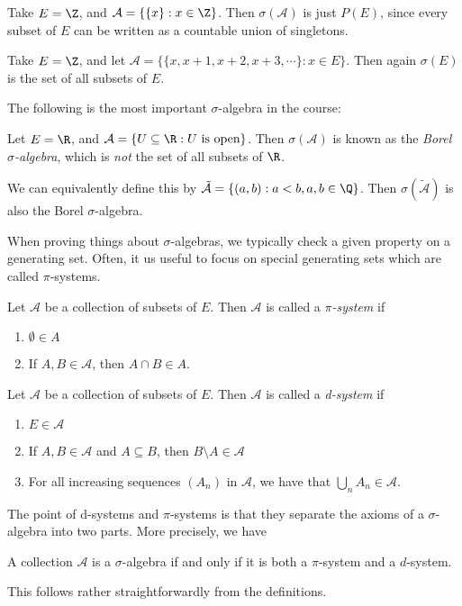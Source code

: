 \documentclass[a4paper]{article}
\begin{document}
\begin{eg}
  Take $E = \Z$, and $\mathcal{A} = \{\{x\}: x \in \Z\}$. Then $\sigma(\mathcal{A})$ is just $P(E)$, since every subset of $E$ can be written as a countable union of singletons.
\end{eg}

\begin{eg}
  Take $E = \Z$, and let $\mathcal{A} = \{ \{x, x + 1, x + 2, x + 3, \cdots\}: x \in E\}$. Then again $\sigma(E)$ is the set of all subsets of $E$.
\end{eg}

The following is the most important $\sigma$-algebra in the course:
\begin{defi}
  Let $E = \R$, and $\mathcal{A} = \{U \subseteq \R: U \text{ is open}\}$. Then $\sigma(\mathcal{A})$ is known as the \emph{Borel $\sigma$-algebra}, which is \emph{not} the set of all subsets of $\R$.

  We can equivalently define this by $\tilde{\mathcal{A}} = \{(a, b): a < b, a, b \in \Q\}$. Then $\sigma(\tilde{\mathcal{A}})$ is also the Borel $\sigma$-algebra.
\end{defi}

When proving things about $\sigma$-algebras, we typically check a given property on a generating set. Often, it us useful to focus on special generating sets which are called $\pi$-systems.

\begin{defi}[$\pi$-system]
  Let $\mathcal{A}$ be a collection of subsets of $E$. Then $\mathcal{A}$ is called a \emph{$\pi$-system} if
  \begin{enumerate}
    \item $\emptyset \in A$
    \item If $A, B \in \mathcal{A}$, then $A \cap B \in A$.
  \end{enumerate}
\end{defi}

\begin{defi}[d-system]
  Let $\mathcal{A}$ be a collection of subsets of $E$. Then $\mathcal{A}$ is called a \emph{d-system} if
  \begin{enumerate}
    \item $E \in \mathcal{A}$
    \item If $A, B \in \mathcal{A}$ and $A \subseteq B$, then $B \setminus A \in \mathcal{A}$
    \item For all increasing sequences $(A_n)$ in $\mathcal{A}$, we have that $\bigcup_n A_n \in \mathcal{A}$.
  \end{enumerate}
\end{defi}
The point of d-systems and $\pi$-systems is that they separate the axioms of a $\sigma$-algebra into two parts. More precisely, we have
\begin{prop}
  A collection $\mathcal{A}$ is a $\sigma$-algebra if and only if it is both a $\pi$-system and a $d$-system.
\end{prop}
This follows rather straightforwardly from the definitions.
\end{document}
